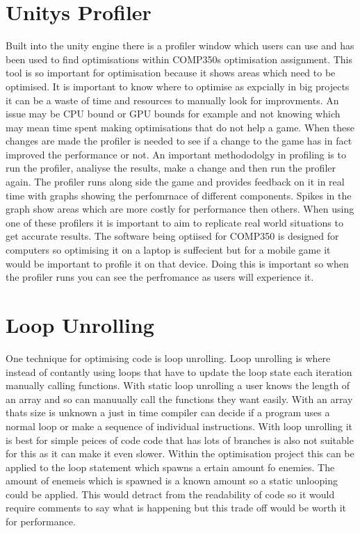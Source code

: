 \documentclass[journal]{IEEEtran}
\begin{document}
\section{Unitys Profiler}
Built into the unity engine there is a profiler window which users can use and has been used to find optimisations within COMP350s optimisation assignment.
This tool is so important for optimisation because it shows areas which need to be optimised.
It is important to know where to optimise as expcially in big projects it can be a waste of time and resources to manually look for improvments.%
An issue may be CPU bound or GPU bounds for example and not knowing which may mean time spent making optimisations that do not help a game.
When these changes are made the profiler is needed to see if a change to the game has in fact improved the performance or not.%
An important methododolgy in profiling is to run the profiler, analiyse the results, make a change and then run the profiler again.%
The profiler runs along side the game and provides feedback on it in real time with graphs showing the perfomrnace of different components.%
Spikes in the graph show areas which are more costly for performance then others.
When using one of these profilers it is important to aim to replicate real world situations to get accurate results. 
The software being optiised for COMP350 is designed for computers so optimising it on a laptop is suffecient but for a mobile game it would be important to profile it on that device.
Doing this is important so when the profiler runs you can see the perfromance as users will experience it. %


\section{Loop Unrolling}
One technique for optimising code is loop unrolling. Loop unrolling is where instead of contantly using loops that have to update the loop state each iteration manually calling functions. With static loop unrolling a user knows the length of an array and so can manuually call the functions they want easily. With an array thats size is unknown a just in time compiler can decide if a program uses a normal loop or make a sequence of individual instructions. With loop unrolling it is best for simple peices of code code that has lots of branches is also not suitable for this as it can make it even slower.%
Within the optimisation project this can be applied to the loop statement which spawns a ertain amount fo enemies. The amount of enemeis which is spawned is a known amount so a static unlooping could be applied.
This would detract from the readability of code so it would require comments to say what is happening but this trade off would be worth it for performance.%
\end{document}
